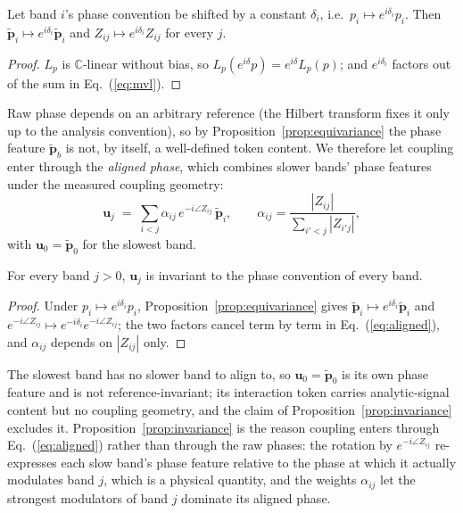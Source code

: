 \begin{proposition}
\label{prop:equivariance}
Let band $i$'s phase convention be shifted by a constant $\delta_i$, i.e.\
$p_i \mapsto e^{i\delta_i} p_i$. Then $\tilde{\mathbf{p}}_i \mapsto
e^{i\delta_i}\tilde{\mathbf{p}}_i$ and $Z_{ij} \mapsto e^{i\delta_i} Z_{ij}$
for every $j$.
\end{proposition}
\begin{proof}
$L_p$ is $\mathbb{C}$-linear without bias, so $L_p(e^{i\delta}p) =
e^{i\delta}L_p(p)$; and $e^{i\delta_i}$ factors out of the sum in
Eq.~(\ref{eq:mvl}).
\end{proof}

Raw phase depends on an arbitrary reference (the Hilbert transform fixes
it only up to the analysis convention), so by
Proposition~\ref{prop:equivariance} the phase feature
$\tilde{\mathbf{p}}_b$ is not, by itself, a well-defined token content.
We therefore let coupling enter through the \emph{aligned phase}, which
combines slower bands' phase features under the measured coupling geometry:
\begin{equation}
\mathbf{u}_j \;=\; \sum_{i<j} \alpha_{ij}\, e^{-i \angle Z_{ij}}\,
\tilde{\mathbf{p}}_i,
\qquad
\alpha_{ij} = \frac{|Z_{ij}|}{\sum_{i'<j}|Z_{i'j}|},
\label{eq:aligned}
\end{equation}
with $\mathbf{u}_0 = \tilde{\mathbf{p}}_0$ for the slowest band.

\begin{proposition}
\label{prop:invariance}
For every band $j > 0$, $\mathbf{u}_j$ is invariant to the phase convention
of every band.
\end{proposition}
\begin{proof}
Under $p_i \mapsto e^{i\delta_i} p_i$, Proposition~\ref{prop:equivariance}
gives $\tilde{\mathbf{p}}_i \mapsto e^{i\delta_i}\tilde{\mathbf{p}}_i$ and
$e^{-i\angle Z_{ij}} \mapsto e^{-i\delta_i}e^{-i\angle Z_{ij}}$; the two
factors cancel term by term in Eq.~(\ref{eq:aligned}), and $\alpha_{ij}$
depends on $|Z_{ij}|$ only.
\end{proof}

The slowest band has no slower band to align to, so $\mathbf{u}_0 =
\tilde{\mathbf{p}}_0$ is its own phase feature and is not
reference-invariant; its interaction token carries analytic-signal
content but no coupling geometry, and the claim of
Proposition~\ref{prop:invariance} excludes it.
Proposition~\ref{prop:invariance} is the reason coupling enters through
Eq.~(\ref{eq:aligned}) rather than through the raw phases: the rotation by
$e^{-i\angle Z_{ij}}$ re-expresses each slow band's phase feature relative
to the phase at which it actually modulates band $j$, which is a physical
quantity, and the weights $\alpha_{ij}$ let the strongest modulators of
band $j$ dominate its aligned phase.

